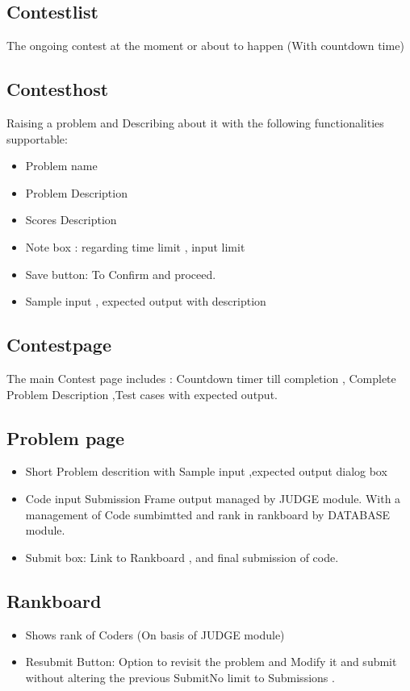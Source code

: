 \documentclass{article}
\begin{document}
\subsection{Contestlist}
The ongoing contest at the moment or about to happen (With countdown time)

\subsection{Contesthost}
Raising a problem and Describing about it with the following functionalities supportable:
\begin{itemize}
\item Problem name 
\item Problem Description
\item Scores Description
\item Note box : regarding time limit , input limit
\item Save button: To Confirm and proceed.
\item Sample input , expected output with description
\end{itemize}

\subsection{Contestpage}
The main Contest page includes : Countdown timer till completion , Complete Problem Description ,Test cases with expected output. 

\subsection{Problem page}
\begin{itemize}
\item Short Problem descrition with Sample input ,expected output dialog box
\item Code input Submission Frame output managed by JUDGE module. With a management of
Code sumbimtted and rank in rankboard by DATABASE module.
\item Submit box: Link to Rankboard , and final submission of code.
\end{itemize}

\subsection{Rankboard}
\begin{itemize}
\item Shows rank of Coders (On basis of JUDGE module)
\item Resubmit Button: Option to revisit the problem and Modify it and submit without altering the previous Submit{No limit to Submissions }.
\end{itemize}


\end{document}
